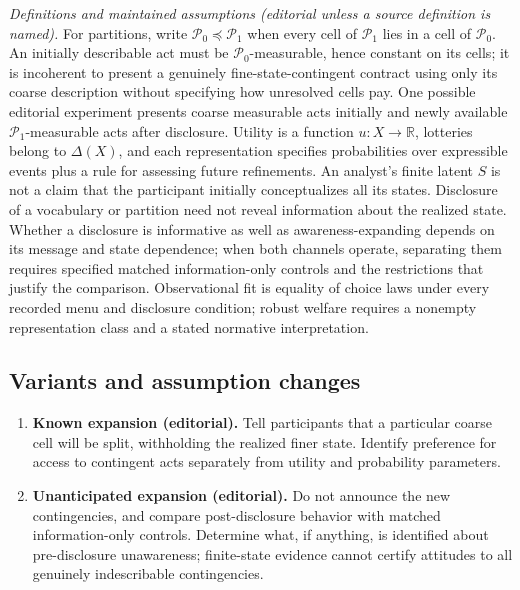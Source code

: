 \documentclass[11pt,a4paper]{article}
\begin{document}
\emph{Definitions and maintained assumptions (editorial unless a source definition is named).} For partitions, write \(\mathcal P_0\preceq\mathcal P_1\) when every cell of \(\mathcal P_1\) lies in a cell of \(\mathcal P_0\). An initially describable act must be \(\mathcal P_0\)-measurable, hence constant on its cells; it is incoherent to present a genuinely fine-state-contingent contract using only its coarse description without specifying how unresolved cells pay. One possible editorial experiment presents coarse measurable acts initially and newly available \(\mathcal P_1\)-measurable acts after disclosure. Utility is a function \(u:X\to\mathbb R\), lotteries belong to \(\Delta(X)\), and each representation specifies probabilities over expressible events plus a rule for assessing future refinements. An analyst’s finite latent \(S\) is not a claim that the participant initially conceptualizes all its states. Disclosure of a vocabulary or partition need not reveal information about the realized state. Whether a disclosure is informative as well as awareness-expanding depends on its message and state dependence; when both channels operate, separating them requires specified matched information-only controls and the restrictions that justify the comparison. Observational fit is equality of choice laws under every recorded menu and disclosure condition; robust welfare requires a nonempty representation class and a stated normative interpretation.
\subsection*{Variants and assumption changes}
\begin{enumerate}
\item \textbf{Known expansion (editorial).} Tell participants that a particular coarse cell will be split, withholding the realized finer state. Identify preference for access to contingent acts separately from utility and probability parameters.
\item \textbf{Unanticipated expansion (editorial).} Do not announce the new contingencies, and compare post-disclosure behavior with matched information-only controls. Determine what, if anything, is identified about pre-disclosure unawareness; finite-state evidence cannot certify attitudes to all genuinely indescribable contingencies.
\end{enumerate}
\end{document}
